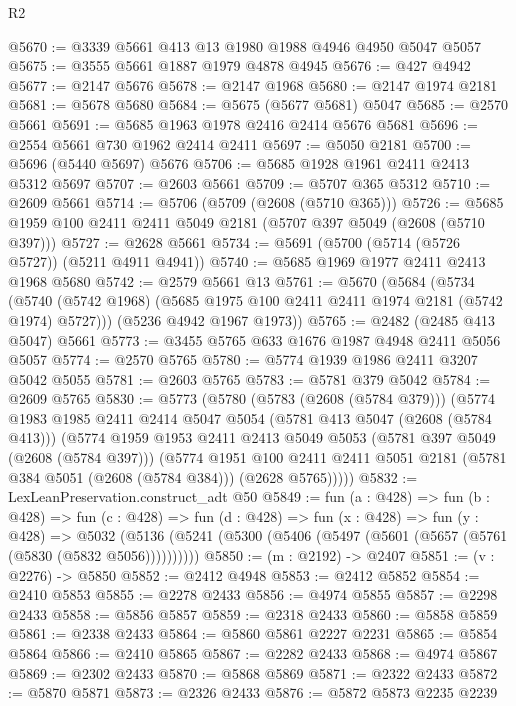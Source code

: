\begin{lexlean}{R2}
\begin{coremodule}
@5670 := @3339 @5661 @413 @13 @1980 @1988 @4946 @4950 @5047 @5057
@5675 := @3555 @5661 @1887 @1979 @4878 @4945
@5676 := @427 @4942
@5677 := @2147 @5676
@5678 := @2147 @1968
@5680 := @2147 @1974 @2181
@5681 := @5678 @5680
@5684 := @5675 (@5677 @5681) @5047
@5685 := @2570 @5661
@5691 := @5685 @1963 @1978 @2416 @2414 @5676 @5681
@5696 := @2554 @5661 @730 @1962 @2414 @2411
@5697 := @5050 @2181
@5700 := @5696 (@5440 @5697) @5676
@5706 := @5685 @1928 @1961 @2411 @2413 @5312 @5697
@5707 := @2603 @5661
@5709 := @5707 @365 @5312
@5710 := @2609 @5661
@5714 := @5706 (@5709 (@2608 (@5710 @365)))
@5726 := @5685 @1959 @100 @2411 @2411 @5049 @2181 (@5707 @397 @5049 (@2608 (@5710 @397)))
@5727 := @2628 @5661
@5734 := @5691 (@5700 (@5714 (@5726 @5727)) (@5211 @4911 @4941))
@5740 := @5685 @1969 @1977 @2411 @2413 @1968 @5680
@5742 := @2579 @5661 @13
@5761 := @5670
    (@5684
      (@5734 (@5740 (@5742 @1968) (@5685 @1975 @100 @2411 @2411 @1974 @2181 (@5742 @1974) @5727)))
      (@5236 @4942 @1967 @1973))
@5765 := @2482 (@2485 @413 @5047) @5661
@5773 := @3455 @5765 @633 @1676 @1987 @4948 @2411 @5056 @5057
@5774 := @2570 @5765
@5780 := @5774 @1939 @1986 @2411 @3207 @5042 @5055
@5781 := @2603 @5765
@5783 := @5781 @379 @5042
@5784 := @2609 @5765
@5830 := @5773
    (@5780
      (@5783 (@2608 (@5784 @379)))
      (@5774
        @1983
        @1985
        @2411
        @2414
        @5047
        @5054
        (@5781 @413 @5047 (@2608 (@5784 @413)))
        (@5774
          @1959
          @1953
          @2411
          @2413
          @5049
          @5053
          (@5781 @397 @5049 (@2608 (@5784 @397)))
          (@5774
            @1951
            @100
            @2411
            @2411
            @5051
            @2181
            (@5781 @384 @5051 (@2608 (@5784 @384)))
            (@2628 @5765)))))
@5832 := LexLeanPreservation.construct_adt @50
@5849 := fun (a : @428) =>
  fun (b : @428) =>
  fun (c : @428) =>
  fun (d : @428) =>
  fun (x : @428) =>
  fun (y : @428) =>
  @5032 (@5136 (@5241 (@5300 (@5406 (@5497 (@5601 (@5657 (@5761 (@5830 (@5832 @5056))))))))))
@5850 := (m : @2192) -> @2407
@5851 := (v : @2276) -> @5850
@5852 := @2412 @4948
@5853 := @2412 @5852
@5854 := @2410 @5853
@5855 := @2278 @2433
@5856 := @4974 @5855
@5857 := @2298 @2433
@5858 := @5856 @5857
@5859 := @2318 @2433
@5860 := @5858 @5859
@5861 := @2338 @2433
@5864 := @5860 @5861 @2227 @2231
@5865 := @5854 @5864
@5866 := @2410 @5865
@5867 := @2282 @2433
@5868 := @4974 @5867
@5869 := @2302 @2433
@5870 := @5868 @5869
@5871 := @2322 @2433
@5872 := @5870 @5871
@5873 := @2326 @2433
@5876 := @5872 @5873 @2235 @2239

\end{coremodule}
\end{lexlean}
